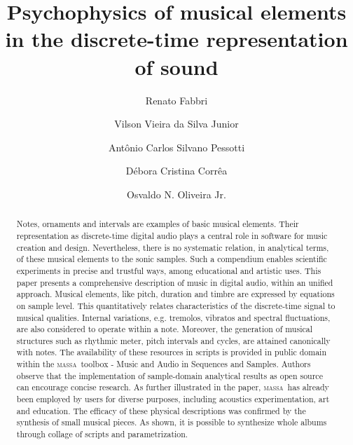 \documentclass[format=acmsmall, review=false, screen=true]{acmart}
\newcommand{\massa}{{\large \textsc{massa}}}
\begin{document}
\title[Psychophysics of musical elements in digital audio]{Psychophysics of musical elements in the discrete-time representation of sound}  
\author{Renato Fabbri}
\author{Vilson Vieira da Silva Junior}
\author{Ant\^onio Carlos Silvano Pessotti}
\author{D\'ebora Cristina Corr\^ea}
\author{Osvaldo N. Oliveira Jr.}

\begin{abstract}
Notes, ornaments and intervals are examples of basic musical elements.
Their representation as discrete-time digital audio plays a central role in software for music creation and design.
Nevertheless, there is no systematic relation, in analytical terms, of these musical elements to the sonic samples.
Such a compendium enables scientific experiments in precise and trustful ways, among educational and artistic uses.
This paper presents a comprehensive description of music in digital audio, within an unified approach.
Musical elements, like pitch, duration and timbre are expressed by equations on sample level.
This quantitatively relates characteristics of the discrete-time signal to musical qualities.
Internal variations, e.g. tremolos, vibratos and spectral fluctuations, are also considered
to operate within a note. Moreover, the generation of musical structures such as rhythmic meter,
pitch intervals and cycles, are attained canonically with notes. 
The availability of these resources in scripts is provided in public domain within the \massa\ toolbox - Music and Audio in Sequences and Samples. Authors observe that the implementation of sample-domain analytical results as open source can encourage concise research.
As further illustrated in the paper, \massa\ has already been employed by users for diverse purposes, 
including acoustics experimentation, art and education. The efficacy of these physical descriptions 
was confirmed by the synthesis of small musical pieces.
As shown, it is possible to synthesize whole albums through collage of scripts and parametrization.
\end{abstract}
\end{document}
